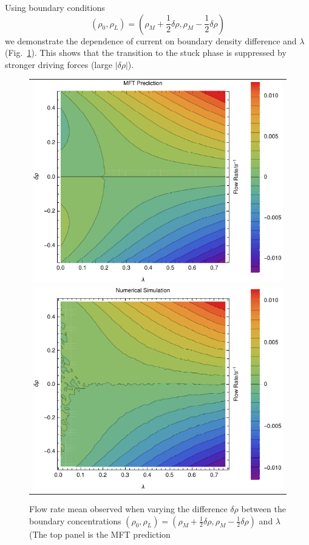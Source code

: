 \documentclass[
reprint, amsmath,amssymb, aps,
 pre, longbibliography,
]{revtex4-1}
\begin{document}
Using boundary conditions
\begin{equation}
(\rho_0,\rho_L)=(\rho_M+\frac{1}{2}\delta\rho, \rho_M-\frac{1}{2}\delta\rho) 
\end{equation}
we demonstrate the
dependence of current on boundary density difference and $\lambda$ (Fig.~\ref{fig:constDens}).  This
shows that the transition to the stuck phase is suppressed by stronger
driving forces (large $|\delta\rho|$).
\begin{figure}[h!]
\vspace{0em}
\begin{center}
 \begin{tabular}{c}
    \includegraphics[width=0.7\linewidth]{newMftPred} \\
    \includegraphics[width=0.7\linewidth]{newFlow}
    \end{tabular}
\end{center}
    \vspace{0em}
\caption{\label{fig:constDens} Flow rate mean observed when varying the difference $\delta\rho$ between the boundary concentrations
$(\rho_0, \rho_L) = (\rho_M + \frac{1}{2} \delta\rho, \rho_M - \frac{1}{2} \delta\rho)$ and $\lambda$ (The top panel is the MFT prediction
}
\end{figure}
\end{document}
